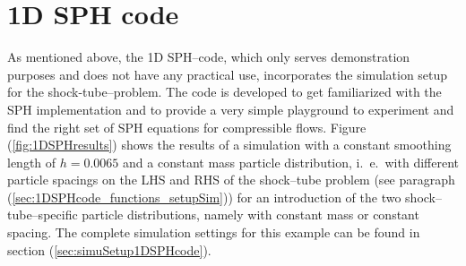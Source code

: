 \documentclass{report}
\begin{document}
\section{1D SPH code}
\label{sec:1DSPHcodeResults}
As mentioned above, the 1D SPH--code, which only serves demonstration purposes and does not have any practical use, incorporates the simulation setup for the shock-tube--problem. The code is developed to get familiarized with the SPH implementation and to provide a very simple playground to experiment and find the right set of SPH equations for compressible flows. Figure (\ref{fig:1DSPHresults}) shows the results of a simulation with a constant smoothing length of $h=0.0065$ and a constant mass particle distribution, i.\ e.\ with different particle spacings on the LHS and RHS of the shock--tube problem (see paragraph (\ref{sec:1DSPHcode_functions_setupSim})) for an introduction of the two shock--tube--specific particle distributions, namely with constant mass or constant spacing. The complete simulation settings for this example can be found in section (\ref{sec:simuSetup1DSPHcode}). 
\end{document}
